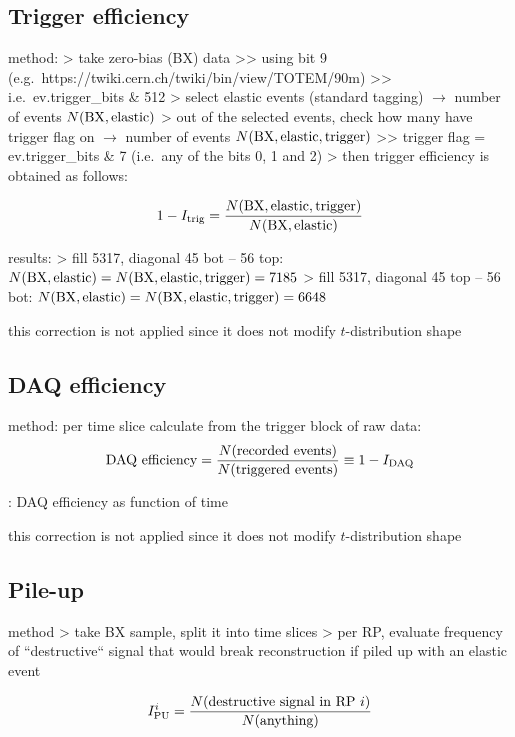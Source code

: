 \subsection{Trigger efficiency}

\> method:
\>> take zero-bias (BX) data
\>>> using bit 9 (e.g.~https://twiki.cern.ch/twiki/bin/view/TOTEM/90m)
\>>> i.e.~ev.trigger\_bits \& 512
\>> select elastic events (standard tagging) $\rightarrow$ number of events $N({\rm BX,elastic})$
\>> out of the selected events, check how many have trigger flag on $\rightarrow$ number of events $N({\rm BX,elastic,trigger})$
\>>> trigger flag = ev.trigger\_bits \& 7 (i.e.~any of the bits 0, 1 and 2)
\>> then trigger efficiency is obtained as follows:

$$1 - I_{\rm trig} = {N({\rm BX,elastic,trigger}) \over N({\rm BX,elastic})}$$

\> results:
\>> fill 5317, diagonal 45 bot -- 56 top: $N({\rm BX,elastic}) = N({\rm BX,elastic,trigger}) = 7185$
\>> fill 5317, diagonal 45 top -- 56 bot: $N({\rm BX,elastic}) = N({\rm BX,elastic,trigger}) = 6648$

\> this correction is not applied since it does not modify $t$-distribution shape



\subsection{DAQ efficiency}

\> method: per time slice calculate from the trigger block of raw data:
$$\hbox{DAQ efficiency} = {N(\hbox{recorded events})\over N(\hbox{triggered events})} \equiv 1 - I_{\rm DAQ}$$

\> : DAQ efficiency as function of time

\> this correction is not applied since it does not modify $t$-distribution shape



\subsection{Pile-up}

\> method
\>> take BX sample, split it into time slices
\>> per RP, evaluate frequency of ``destructive`` signal that would break reconstruction if piled up with an elastic event

$$I^{i}_{\rm PU} = {N(\hbox{destructive signal in RP $i$})\over N(\hbox{anything})}$$

